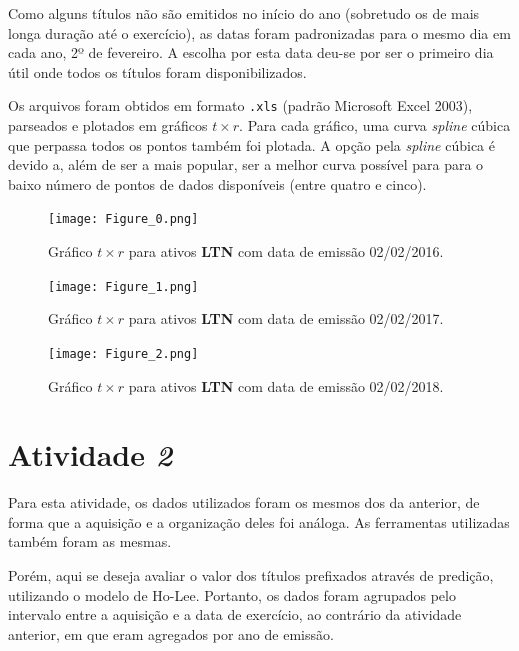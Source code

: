 \documentclass{article}
\begin{document}
Como alguns títulos não são emitidos no início do ano (sobretudo os de mais longa duração até o exercício), as datas foram padronizadas para o mesmo dia em cada ano, 2º de fevereiro.
A escolha por esta data deu-se por ser o primeiro dia útil onde todos os títulos foram disponibilizados.

Os arquivos foram obtidos em formato \texttt{.xls} (padrão Microsoft Excel 2003), parseados e plotados em gráficos $t \times r$.
Para cada gráfico, uma curva \emph{spline} cúbica que perpassa todos os pontos também foi plotada.
A opção pela \emph{spline} cúbica é devido a, além de ser a mais popular, ser a melhor curva possível para para o baixo número de pontos de dados disponíveis (entre quatro e cinco).


\begin{figure}[H]
	\texttt{[image: Figure\_0.png]}
	\centering
	
	\caption{Gráfico $t \times r$ para ativos \textbf{LTN} com data de emissão 02/02/2016.}
	\label{}
\end{figure}

\begin{figure}[]
	\texttt{[image: Figure\_1.png]}
	\centering
	
	\caption{Gráfico $t \times r$ para ativos \textbf{LTN} com data de emissão 02/02/2017.}
	\label{}
\end{figure}

\begin{figure}[]
	\texttt{[image: Figure\_2.png]}
	\centering
	
	\caption{Gráfico $t \times r$ para ativos \textbf{LTN} com data de emissão 02/02/2018.}
	\label{}
\end{figure}



\section*{Atividade \emph{2}}

Para esta atividade, os dados utilizados foram os mesmos dos da anterior, de forma que a aquisição e a organização deles foi análoga.
As ferramentas utilizadas também foram as mesmas.

Porém, aqui se deseja avaliar o valor dos títulos prefixados através de predição, utilizando o modelo de Ho-Lee.
Portanto, os dados foram agrupados pelo intervalo entre a aquisição e a data de exercício, ao contrário da atividade anterior, em que eram agregados por ano de emissão.
\end{document}
